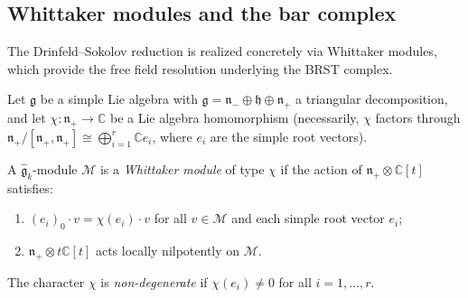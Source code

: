 \subsection{Whittaker modules and the bar complex}
\label{sec:whittaker-modules}

The Drinfeld--Sokolov reduction is realized concretely via
Whittaker modules, which provide the free field resolution
underlying the BRST complex.

\begin{definition}
\label{def:whittaker-module}
Let $\mathfrak{g}$ be a simple Lie algebra with
$\mathfrak{g} = \mathfrak{n}_- \oplus \mathfrak{h} \oplus
\mathfrak{n}_+$ a triangular decomposition, and let
$\chi \colon \mathfrak{n}_+ \to \mathbb{C}$ be a Lie algebra
homomorphism (necessarily, $\chi$ factors through
$\mathfrak{n}_+ / [\mathfrak{n}_+, \mathfrak{n}_+] \cong
\bigoplus_{i=1}^r \mathbb{C} e_i$, where $e_i$ are the
simple root vectors).

A $\widehat{\mathfrak{g}}_k$-module $\mathcal{M}$ is a
\emph{Whittaker module} of type $\chi$ if the action of
$\mathfrak{n}_+ \otimes \mathbb{C}[t]$ satisfies:
\begin{enumerate}[label=\textup{(\roman*)}]
\item $(e_i)_0 \cdot v = \chi(e_i) \cdot v$ for all
  $v \in \mathcal{M}$ and each simple root vector $e_i$;
\item $\mathfrak{n}_+ \otimes t\mathbb{C}[t]$ acts locally
  nilpotently on $\mathcal{M}$.
\end{enumerate}
The character $\chi$ is \emph{non-degenerate} if
$\chi(e_i) \neq 0$ for all $i = 1, \ldots, r$.
\end{definition}


